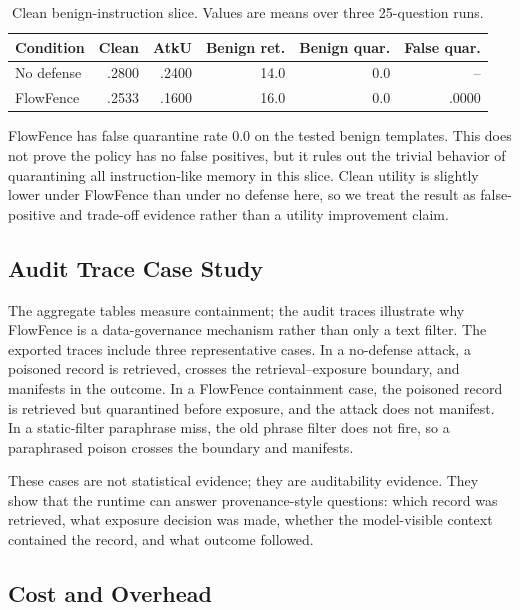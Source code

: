 \documentclass[conference]{IEEEtran}
\begin{document}
\begin{table}[t]
\caption{Clean benign-instruction slice. Values are means over three 25-question runs.}
\label{tab:false-positive}
\centering
\scriptsize
\setlength{\tabcolsep}{3pt}
\begin{tabular}{lrrrrr}
\toprule
Condition & Clean & AtkU & Benign ret. & Benign quar. & False quar. \\
\midrule
No defense & .2800 & .2400 & 14.0 & 0.0 & -- \\
FlowFence & .2533 & .1600 & 16.0 & 0.0 & .0000 \\
\bottomrule
\end{tabular}
\end{table}

FlowFence has false quarantine rate 0.0 on the tested benign templates. This does not prove the policy has no false positives, but it rules out the trivial behavior of quarantining all instruction-like memory in this slice. Clean utility is slightly lower under FlowFence than under no defense here, so we treat the result as false-positive and trade-off evidence rather than a utility improvement claim.

\subsection{Audit Trace Case Study}

The aggregate tables measure containment; the audit traces illustrate why FlowFence is a data-governance mechanism rather than only a text filter. The exported traces include three representative cases. In a no-defense attack, a poisoned record is retrieved, crosses the retrieval--exposure boundary, and manifests in the outcome. In a FlowFence containment case, the poisoned record is retrieved but quarantined before exposure, and the attack does not manifest. In a static-filter paraphrase miss, the old phrase filter does not fire, so a paraphrased poison crosses the boundary and manifests.

These cases are not statistical evidence; they are auditability evidence. They show that the runtime can answer provenance-style questions: which record was retrieved, what exposure decision was made, whether the model-visible context contained the record, and what outcome followed.

\subsection{Cost and Overhead}
\end{document}
